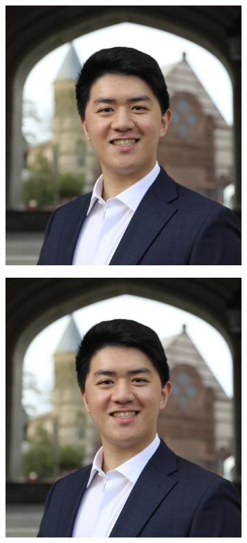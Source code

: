 \documentclass[12pt,a4paper]{article}
\begin{document}
\begin{figure}[!ht]
    \begin{subfigure}{0.3\textwidth}
        \includegraphics[width=\linewidth]{figures/cat_momo_1.png}
        \caption{}
    \end{subfigure}
    \hfill
    \begin{subfigure}{0.3\textwidth}
        \includegraphics[width=\linewidth]{figures/cat_momo_1.png}

\end{subfigure}
\end{figure}
\end{document}
